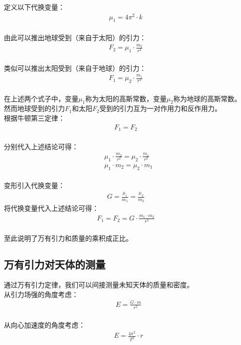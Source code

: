 \documentclass[UTF8]{ctexart}
\begin{document}
\newpage

    定义以下代换变量：
    \begin{align}
        \mu_1=4\pi^2\cdot k
    \end{align}\\
    由此可以推出地球受到（来自于太阳）的引力：
    \begin{align}
        F_2=\mu_1\cdot\frac{m_2}{r^2}
    \end{align}\\
    类似可以推出太阳受到（来自于地球）的引力：
    \begin{align}
        F_1=\mu_2\cdot\frac{m_1}{r^2}
    \end{align}\\
    在上述两个式子中，变量$\mu_1$称为太阳的高斯常数，变量$\mu_2$称为地球的高斯常数。\\[8mm]
    然而地球受到的引力$F_1$和太阳$F_2$受到的引力互为一对作用力和反作用力。\\[3mm]
    根据牛顿第三定律：
    \begin{align}
        F_1=F_2
    \end{align}\\
    分别代入上述结论可得：
    \begin{align}
        &\mu_1\cdot\frac{m_2}{r^2}=\mu_2\cdot\frac{m_1}{r^2}\\[3mm]
        &\mu_1\cdot m_2=\mu_2\cdot m_1
    \end{align}\\
    变形引入代换变量：
    \begin{align}
        G=\frac{\mu_1}{m_1}=\frac{\mu_2}{m_2}
    \end{align}
    将代换变量代入上述结论可得：
    \begin{align}
        F_1=F_2=G\cdot\frac{m_1\cdot m_2}{r^2}
    \end{align}\\
    至此说明了万有引力和质量的乘积成正比。

\newpage

\subsection{万有引力对天体的测量}
    通过万有引力定律，我们可以间接测量未知天体的质量和密度。\\[3mm]
    从引力场强的角度考虑：
    \setcounter{equation}{0}
    \begin{align}
        &E=\frac{G\cdot m}{r^2}
    \end{align}\\
    从向心加速度的角度考虑：
    \begin{align}
        &E=\frac{4\pi^2}{T^2}\cdot r
    \end{align}
\end{document}
